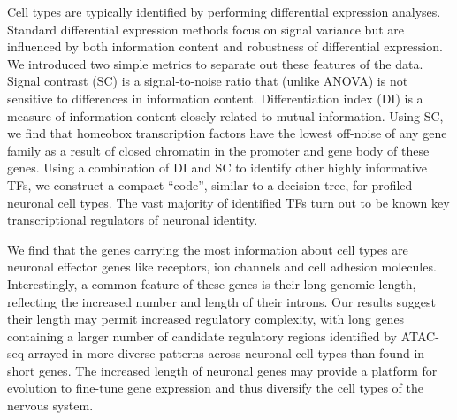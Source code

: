 Cell types are typically identified by performing differential expression analyses. Standard differential expression methods focus on signal variance but are influenced by both information content and robustness of differential expression. We introduced two simple metrics to separate out these features of the data. Signal contrast (SC) is a signal-to-noise ratio that (unlike ANOVA) is not sensitive to differences in information content. Differentiation index (DI) is a measure of information content closely related to mutual information. Using SC, we find that homeobox transcription factors have the lowest off-noise of any gene family as a result of closed chromatin in the promoter and gene body of these genes. Using a combination of DI and SC to identify other highly informative TFs, we construct a compact “code”, similar to a decision tree, for profiled neuronal cell types. The vast majority of identified TFs turn out to be known key transcriptional regulators of neuronal identity.

We find that the genes carrying the most information about cell types are neuronal effector genes like receptors, ion channels and cell adhesion molecules. Interestingly, a common feature of these genes is their long genomic length, reflecting the increased number and length of their introns. 
Our results suggest their length may permit increased regulatory complexity, with long genes containing a larger number of candidate regulatory regions identified by ATAC-seq arrayed in more diverse patterns across neuronal cell types than found in short genes. The increased length of neuronal genes may provide a platform for evolution to fine-tune gene expression and thus diversify the cell types of the nervous system.
